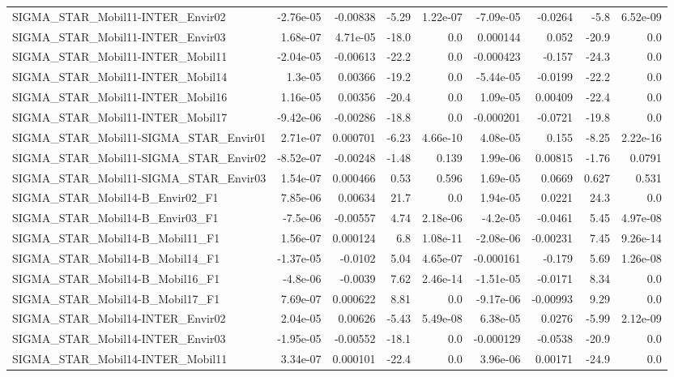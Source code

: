 \begin{tabular}{lrrrrrrrr}
SIGMA_STAR_Mobil11-INTER_Envir02 & -2.76e-05 & -0.00838 & -5.29 & 1.22e-07 & -7.09e-05 & -0.0264 & -5.8 & 6.52e-09 \\
SIGMA_STAR_Mobil11-INTER_Envir03 & 1.68e-07 & 4.71e-05 & -18.0 & 0.0 & 0.000144 & 0.052 & -20.9 & 0.0 \\
SIGMA_STAR_Mobil11-INTER_Mobil11 & -2.04e-05 & -0.00613 & -22.2 & 0.0 & -0.000423 & -0.157 & -24.3 & 0.0 \\
SIGMA_STAR_Mobil11-INTER_Mobil14 & 1.3e-05 & 0.00366 & -19.2 & 0.0 & -5.44e-05 & -0.0199 & -22.2 & 0.0 \\
SIGMA_STAR_Mobil11-INTER_Mobil16 & 1.16e-05 & 0.00356 & -20.4 & 0.0 & 1.09e-05 & 0.00409 & -22.4 & 0.0 \\
SIGMA_STAR_Mobil11-INTER_Mobil17 & -9.42e-06 & -0.00286 & -18.8 & 0.0 & -0.000201 & -0.0721 & -19.8 & 0.0 \\
SIGMA_STAR_Mobil11-SIGMA_STAR_Envir01 & 2.71e-07 & 0.000701 & -6.23 & 4.66e-10 & 4.08e-05 & 0.155 & -8.25 & 2.22e-16 \\
SIGMA_STAR_Mobil11-SIGMA_STAR_Envir02 & -8.52e-07 & -0.00248 & -1.48 & 0.139 & 1.99e-06 & 0.00815 & -1.76 & 0.0791 \\
SIGMA_STAR_Mobil11-SIGMA_STAR_Envir03 & 1.54e-07 & 0.000466 & 0.53 & 0.596 & 1.69e-05 & 0.0669 & 0.627 & 0.531 \\
SIGMA_STAR_Mobil14-B_Envir02_F1 & 7.85e-06 & 0.00634 & 21.7 & 0.0 & 1.94e-05 & 0.0221 & 24.3 & 0.0 \\
SIGMA_STAR_Mobil14-B_Envir03_F1 & -7.5e-06 & -0.00557 & 4.74 & 2.18e-06 & -4.2e-05 & -0.0461 & 5.45 & 4.97e-08 \\
SIGMA_STAR_Mobil14-B_Mobil11_F1 & 1.56e-07 & 0.000124 & 6.8 & 1.08e-11 & -2.08e-06 & -0.00231 & 7.45 & 9.26e-14 \\
SIGMA_STAR_Mobil14-B_Mobil14_F1 & -1.37e-05 & -0.0102 & 5.04 & 4.65e-07 & -0.000161 & -0.179 & 5.69 & 1.26e-08 \\
SIGMA_STAR_Mobil14-B_Mobil16_F1 & -4.8e-06 & -0.0039 & 7.62 & 2.46e-14 & -1.51e-05 & -0.0171 & 8.34 & 0.0 \\
SIGMA_STAR_Mobil14-B_Mobil17_F1 & 7.69e-07 & 0.000622 & 8.81 & 0.0 & -9.17e-06 & -0.00993 & 9.29 & 0.0 \\
SIGMA_STAR_Mobil14-INTER_Envir02 & 2.04e-05 & 0.00626 & -5.43 & 5.49e-08 & 6.38e-05 & 0.0276 & -5.99 & 2.12e-09 \\
SIGMA_STAR_Mobil14-INTER_Envir03 & -1.95e-05 & -0.00552 & -18.1 & 0.0 & -0.000129 & -0.0538 & -20.9 & 0.0 \\
SIGMA_STAR_Mobil14-INTER_Mobil11 & 3.34e-07 & 0.000101 & -22.4 & 0.0 & 3.96e-06 & 0.00171 & -24.9 & 0.0 \\

\end{tabular}
